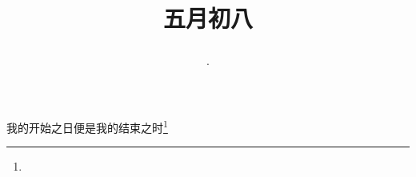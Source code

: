 \title{\date[d=13,m=6,y=2024][year:cn-y,年,month:cn,day:cn,日,·,weekday]·五月初八 }
我的开始之日便是我的结束之时\footnote{ }

